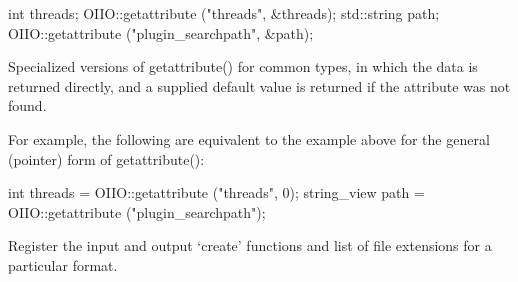 \begin{code}
      int threads;
      OIIO::getattribute ("threads", &threads);
      std::string path;
      OIIO::getattribute ("plugin_searchpath", &path);
\end{code}
\apiend

 
Specialized versions of {\cf getattribute()} for common types, in which the
data is returned directly, and a supplied default value is returned if the
attribute was not found.

For example, the following are equivalent to the example above for the
general (pointer) form of {\cf getattribute()}:

\begin{code}
      int threads = OIIO::getattribute ("threads", 0);
      string_view path = OIIO::getattribute ("plugin_searchpath");
\end{code}
\apiend


Register the input and output `create' functions and list of file extensions
for a particular format.
\apiend



\chapwidthend
